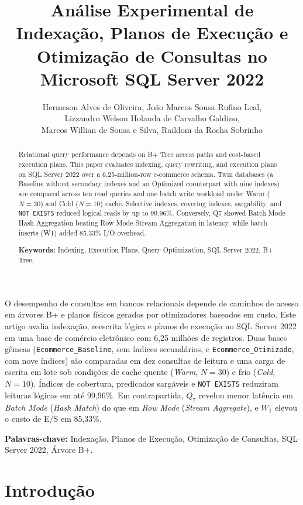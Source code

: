 \documentclass[12pt]{article}
\title{Análise Experimental de Indexação, Planos de Execução e\\ Otimização de Consultas no Microsoft SQL Server 2022}
\author{Hermeson Alves de Oliveira, João Marcos Sousa Rufino Leal,\\
  Lizzandro Welson Holanda de Carvalho Galdino,\\
  Marcos Willian de Sousa e Silva, Raildom da Rocha Sobrinho}
\begin{document}
\maketitle

\begin{abstract}
Relational query performance depends on B+ Tree access paths and cost-based execution plans. This paper evaluates indexing, query rewriting, and execution plans on SQL Server 2022 over a 6.25-million-row e-commerce schema. Twin databases (a Baseline without secondary indexes and an Optimized counterpart with nine indexes) are compared across ten read queries and one batch write workload under Warm ($N=30$) and Cold ($N=10$) cache. Selective indexes, covering indexes, sargability, and \texttt{NOT EXISTS} reduced logical reads by up to 99.96\%. Conversely, Q7 showed Batch Mode Hash Aggregation beating Row Mode Stream Aggregation in latency, while batch inserts (W1) added 85.33\% I/O overhead.

\textbf{Keywords:} Indexing, Execution Plans, Query Optimization, SQL Server 2022, B+ Tree.
\end{abstract}

\begin{resumo}
O desempenho de consultas em bancos relacionais depende de caminhos de acesso em árvores B+ e planos físicos gerados por otimizadores baseados em custo. Este artigo avalia indexação, reescrita lógica e planos de execução no SQL Server 2022 em uma base de comércio eletrônico com 6,25 milhões de registros. Duas bases gêmeas (\texttt{Ecommerce\_Baseline}, sem índices secundários, e \texttt{Ecommerce\_Otimizado}, com nove índices) são comparadas em dez consultas de leitura e uma carga de escrita em lote sob condições de cache quente (\textit{Warm}, $N=30$) e frio (\textit{Cold}, $N=10$). Índices de cobertura, predicados sargáveis e \texttt{NOT EXISTS} reduziram leituras lógicas em até 99,96\%. Em contrapartida, $Q_7$ revelou menor latência em \textit{Batch Mode} (\textit{Hash Match}) do que em \textit{Row Mode} (\textit{Stream Aggregate}), e $W_1$ elevou o custo de E/S em 85,33\%.

\textbf{Palavras-chave:} Indexação, Planos de Execução, Otimização de Consultas, SQL Server 2022, Árvore B+.
\end{resumo}

\section{Introdução}
\end{document}
